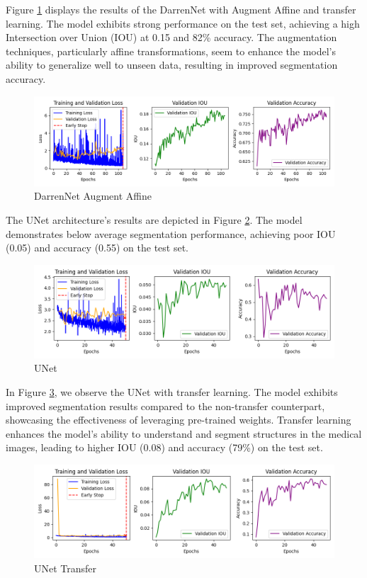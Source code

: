 Figure \ref{fig:darren_aug_aff} displays the results of the DarrenNet with Augment Affine and transfer learning. The model exhibits strong performance on the test set, achieving a high Intersection over Union (IOU) at 0.15 and 82\% accuracy. The augmentation techniques, particularly affine transformations, seem to enhance the model's ability to generalize well to unseen data, resulting in improved segmentation accuracy.

\begin{figure}[H]
	\centering
	\includegraphics[width=\textwidth]{plots/darrennet_augment_affine}
	\caption{DarrenNet Augment Affine}
	\label{fig:darren_aug_aff}
\end{figure}


The UNet architecture's results are depicted in Figure \ref{fig:unet}. The model demonstrates below average segmentation performance, achieving poor IOU (0.05) and accuracy (0.55) on the test set.

\begin{figure}[H]
	\centering
	\includegraphics[width=\textwidth]{plots/unet}
	\caption{UNet}
	\label{fig:unet}
\end{figure}

In Figure \ref{fig:unet_transfer}, we observe the UNet with transfer learning. The model exhibits improved segmentation results compared to the non-transfer counterpart, showcasing the effectiveness of leveraging pre-trained weights. Transfer learning enhances the model's ability to understand and segment structures in the medical images, leading to higher IOU (0.08) and accuracy (79\%) on the test set.

\begin{figure}[H]
	\centering
	\includegraphics[width=\textwidth]{plots/unet_transfer}
	\caption{UNet Transfer}
	\label{fig:unet_transfer}
\end{figure}



